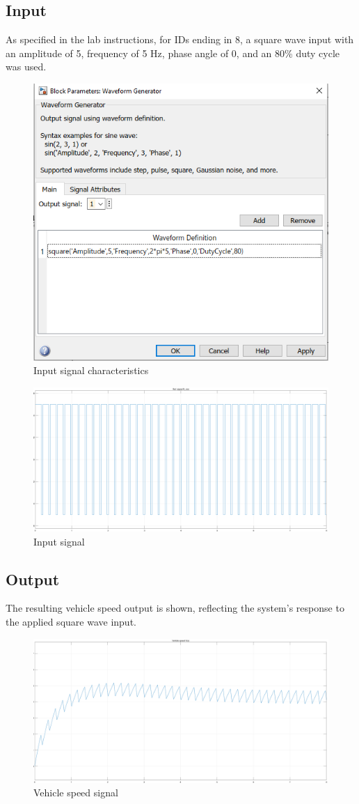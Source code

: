 \documentclass[a4paper, 12pt, english]{article}
\begin{document}
\subsection{Input}
As specified in the lab instructions, for IDs ending in 8, a square wave input with an amplitude of 5, frequency of 5 Hz, phase angle of 0, and an 80\% duty cycle was used.
\begin{figure}[H]
    \centering
    \includegraphics[width=0.5\linewidth]{images/input.png}
    \caption{Input signal characteristics}
    \label{fig:Input signal characteristics}
\end{figure}
\begin{figure}[H]
    \centering
    \includegraphics[width=\linewidth]{images/input_signal.png}
    \caption{Input signal}
    \label{fig:Input signal}
\end{figure}

\subsection{Output}
The resulting vehicle speed output is shown, reflecting the system’s response to the applied square wave input.
\begin{figure}[H]
    \centering
    \includegraphics[width=\linewidth]{images/vehicle_speed.png}
    \caption{Vehicle speed signal}
    \label{fig:Vehicle speed signal}
\end{figure}
\end{document}

